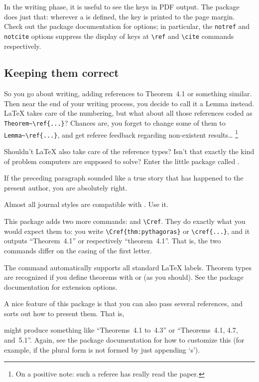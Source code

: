 In the writing phase, it is useful to see the keys in PDF output.
The  package does just that:
wherever a  is defined,
the key is printed to the page margin.
Check out the package documentation for options;
in particular, the \verb|notref| and \verb|notcite| options
suppress the display of keys at \verb|\ref| and \verb|\cite| commands respectively.



%
%
\subsection{Keeping them correct}\label{sec:cleveref}

So you go about writing, adding references to Theorem~4.1 or something similar.
Then near the end of your writing process,
you decide to call it a Lemma instead.
\LaTeX{} takes care of the numbering,
but what about all those references coded as \verb|Theorem~\ref{...}|?
Chances are, you forget to change some of them to \verb|Lemma~\ref{...}|,
and get referee feedback regarding non-existent results\dots%
\footnote{On a positive note: such a referee has really read the paper.}

Shouldn't \LaTeX{} also take care of the reference types?
Isn't that exactly the kind of problem computers are supposed to solve?
Enter the little package called .

\begin{practices}
If the preceding paragraph sounded like a true story that has happened to the present author,
you are absolutely right.

Almost all journal styles are compatible with .
Use it.
\end{practices}

This package adds two more commands:  and \verb|\Cref|.
They do exactly what you would expect them to:
you write \verb|\Cref{thm:pythagoras}| or \verb|\cref{...}|,
and it outputs ``Theorem~4.1'' or respectively ``theorem~4.1''.
That is, the two commands differ on the casing of the first letter.

The command automatically supports all standard \LaTeX{} labels.
Theorem types are recognized if you define theorems with
 or  (as you should).
See the package documentation for extension options.

A nice feature of this package is that you can also pass several references,
and  sorts out how to present them.
That is,
\begin{ExampleCode}
\end{ExampleCode}
might produce something like ``Theorems~4.1 to~4.3''
or ``Theorems~4.1, 4.7, and~5.1''.
Again, see the package documentation for how to customize this
(for example, if the plural form is not formed by just appending `s').

